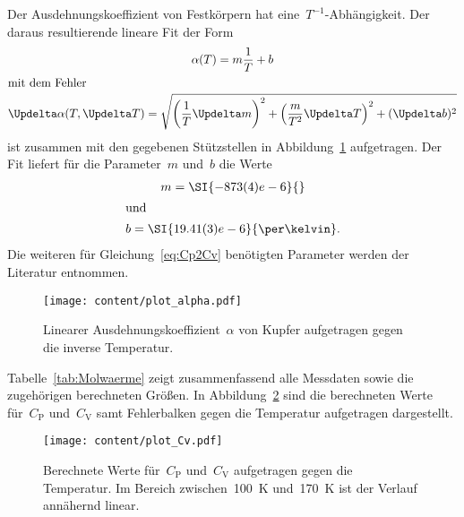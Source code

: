 Der Ausdehnungskoeffizient von Festkörpern hat eine~$T^{-1}$-Abhängigkeit.
Der daraus resultierende lineare Fit der Form
%
\begin{gather}
  \alpha(T)=m\frac{1}{T}+b \\
  \shortintertext{mit dem Fehler}
  \Updelta\alpha(T,\Updelta T)=\sqrt{\left(\frac{1}{T}\Updelta m\right)^2+\left(\frac{m}{T^2}\Updelta T\right)^2+(\Updelta b)^2}
\end{gather}
%
ist zusammen mit den gegebenen Stützstellen in Abbildung~\ref{fig:plot_alpha}
aufgetragen. Der Fit liefert für die Parameter~$m$ und~$b$ die Werte
%
\begin{gather}
  m = \SI{-873(4)e-6}{} \\           %
  \shortintertext{und}
  b = \SI{19.41(3)e-6}{\per\kelvin}. %
\end{gather}
%
Die weiteren für Gleichung~\eqref{eq:Cp2Cv} benötigten Parameter werden der
Literatur entnommen.
%
\begin{figure}[htb]
    \centering
    \texttt{[image: content/plot\_alpha.pdf]}
    \caption{Linearer Ausdehnungskoeffizient~$\alpha$ von Kupfer aufgetragen
    gegen die inverse Temperatur.}
    \label{fig:plot_alpha}
\end{figure}
%
Tabelle~\ref{tab:Molwaerme} zeigt zusammenfassend alle Messdaten
sowie die zugehörigen berechneten Größen. In Abbildung~\ref{fig:plot_Cv} sind
die berechneten Werte für~$C_{\mathrm{P}}$ und~$C_{\mathrm{V}}$ samt
Fehlerbalken gegen die Temperatur aufgetragen dargestellt.

\begin{figure}[htb]
    \centering
    \texttt{[image: content/plot\_Cv.pdf]}
    \caption{Berechnete Werte für~$C_{\mathrm{P}}$ und~$C_{\mathrm{V}}$
    aufgetragen gegen die Temperatur. Im Bereich zwischen~\SI{100}{\kelvin}
    und~\SI{170}{\kelvin} ist der Verlauf annähernd linear.}
    \label{fig:plot_Cv}
\end{figure}

